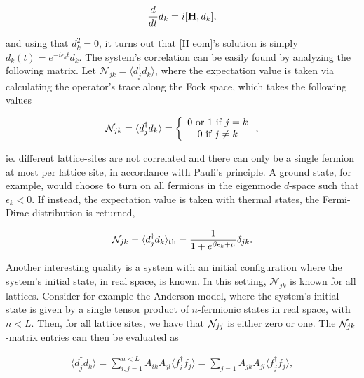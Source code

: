 \documentclass{homework}
\begin{document}
\begin{equation}
\frac{d}{dt} d_k = i [{\bf H}, d_k],
\label{H eom}
\end{equation}

and using that $d_k^2 = 0$, it turns out that \eqref{H eom}'s solution is simply $d_k(t) = e^{-i\epsilon_k t} d_k$. The system's correlation can be easily found by analyzing the following matrix. Let $\mathcal{N}_{jk} = \langle d_j^\dagger d_k \rangle$, where the expectation value is taken via calculating the operator's trace along the Fock space, which takes the following values 

\begin{equation}
    \mathcal{N}_{jk} = \langle d_j^\dagger d_k \rangle = \left\{\begin{array}{c}
        0 \textnormal{ or } 1 \textnormal{ if } j=k  \\
        0 \textnormal{ if } j \neq k 
    \end{array} \right.,
\end{equation}

ie. different lattice-sites are not correlated and there can only be a single fermion at most per lattice site, in accordance with Pauli's principle. A ground state, for example, would choose to turn on all fermions in the eigenmode $d$-space such that $\epsilon_k < 0$. If instead, the expectation value is taken with thermal states, the Fermi-Dirac distribution is returned, 

\begin{equation}
    \mathcal{N}_{jk} = \langle d_j^\dagger d_k \rangle_{\textnormal{th}} =  \frac{1}{1+e^{\beta \epsilon_k + \mu}} \delta_{jk}.
\end{equation}

Another interesting quality is a system with an initial configuration where the system's initial state, in real space, is known. In this setting, $\mathcal{N}_{jk}$ is known for all lattices. Consider for example the Anderson model, where the system's initial state is given by a single tensor product of $n$-fermionic states in real space, with $n<L$. Then, for all lattice sites, we have that $\mathcal{N}_{jj}$ is either zero or one. The $\mathcal{N}_{jk}$-matrix entries can then be evaluated as 

\begin{align*}
    \langle d_j^\dagger d_k \rangle = \sum_{i,j = 1}^{n < L} A_{ik} A_{jl} \langle f_i^\dagger f_j \rangle = \sum_{j=1} A_{jk} A_{jl} \langle f_j^\dagger f_j \rangle,
    \label{real system correlations}
\end{align*}
\end{document}
